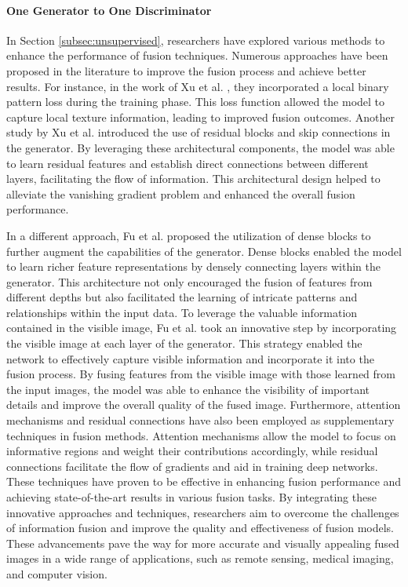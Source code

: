\paragraph{One Generator to One Discriminator}

In Section \ref{subsec:unsupervised}, researchers have explored various methods to enhance the performance of fusion techniques. Numerous approaches have been proposed in the literature to improve the fusion process and achieve better results. For instance, in the work of Xu et al. \cite{xu2020lbp}, they incorporated a local binary pattern loss during the training phase. This loss function allowed the model to capture local texture information, leading to improved fusion outcomes. Another study by Xu et al. \cite{xu2020infrared} introduced the use of residual blocks and skip connections in the generator. By leveraging these architectural components, the model was able to learn residual features and establish direct connections between different layers, facilitating the flow of information. This architectural design helped to alleviate the vanishing gradient problem and enhanced the overall fusion performance.

In a different approach, Fu et al. \cite{fu2021image} proposed the utilization of dense blocks to further augment the capabilities of the generator. Dense blocks enabled the model to learn richer feature representations by densely connecting layers within the generator. This architecture not only encouraged the fusion of features from different depths but also facilitated the learning of intricate patterns and relationships within the input data. To leverage the valuable information contained in the visible image, Fu et al. \cite{fu2021image} took an innovative step by incorporating the visible image at each layer of the generator. This strategy enabled the network to effectively capture visible information and incorporate it into the fusion process. By fusing features from the visible image with those learned from the input images, the model was able to enhance the visibility of important details and improve the overall quality of the fused image. Furthermore, attention mechanisms \cite{wang2021new} and residual connections \cite{xu2020infrared} have also been employed as supplementary techniques in fusion methods. Attention mechanisms allow the model to focus on informative regions and weight their contributions accordingly, while residual connections facilitate the flow of gradients and aid in training deep networks. These techniques have proven to be effective in enhancing fusion performance and achieving state-of-the-art results in various fusion tasks. By integrating these innovative approaches and techniques, researchers aim to overcome the challenges of information fusion and improve the quality and effectiveness of fusion models. These advancements pave the way for more accurate and visually appealing fused images in a wide range of applications, such as remote sensing, medical imaging, and computer vision.


